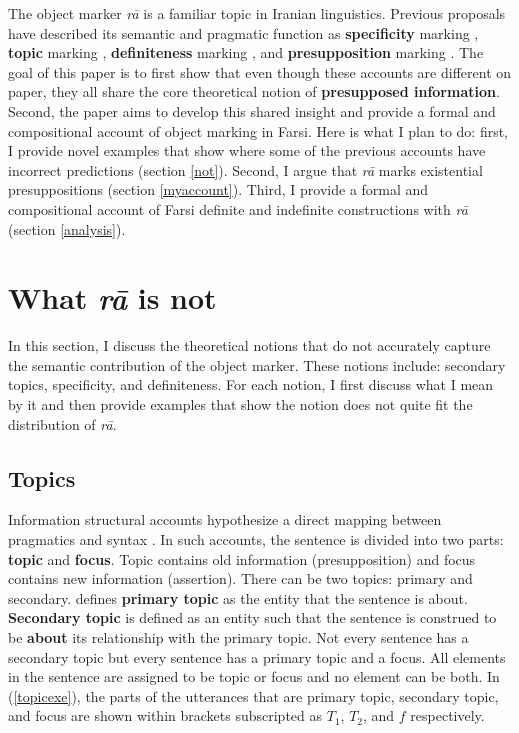 \documentclass[12pt]{article}
\begin{document}
The object marker \emph{r\={a}} is a familiar topic in Iranian linguistics. Previous proposals have described its semantic and pragmatic function as \textbf{specificity} marking \citep{karimi1990obliqueness, karimi1999specificity, karimi2003object}, \textbf{topic} marking \citep{dabir1992dependence, dalrymple2011objects}, \textbf{definiteness} marking \citep{mahootian1997}, and \textbf{presupposition} marking \citep{ghomeshi1996}. The goal of this paper is to first show that even though these accounts are different on paper, they all share the core theoretical notion of \textbf{presupposed information}. Second, the paper aims to develop this shared insight and provide a formal and compositional account of object marking in Farsi. Here is what I plan to do: first, I provide novel examples that show where some of the previous accounts have incorrect predictions (section \ref{not}). Second, I argue that \emph{r\={a}} marks existential presuppositions (section \ref{myaccount}). Third, I provide a formal and compositional account of Farsi definite and indefinite constructions with \emph{r\={a}} (section \ref{analysis}).

\section {What \emph{r\={a}} is not} {\label{not}}

In this section, I discuss the theoretical notions that do not accurately capture the semantic contribution of the object marker. These notions include: secondary topics, specificity, and definiteness. For each notion, I first discuss what I mean by it and then provide examples that show the notion does not quite fit the distribution of \emph{r\={a}}.

\subsection{Topics} Information structural accounts hypothesize a direct mapping between pragmatics and syntax \citep{dabir1992dependence, dalrymple2011objects}. In such accounts, the sentence is divided into two parts: \textbf{topic} and \textbf{focus}. Topic contains old information (presupposition) and focus contains new information (assertion). There can be two topics: primary and secondary. \cite{nikolaeva2001secondary} defines \textbf{primary topic} as the entity that the sentence is about. \textbf {Secondary topic} is defined as an entity such that the sentence is construed to be \textbf{about} its relationship with the primary topic. Not every sentence has a secondary topic but every sentence has a primary topic and a focus. All elements in the sentence are assigned to be topic or focus and no element can be both. In (\ref{topicexe}), the parts of the utterances that are primary topic, secondary topic, and focus are shown within brackets subscripted as $T_1$, $T_2$, and $f$ respectively.\\
\end{document}
